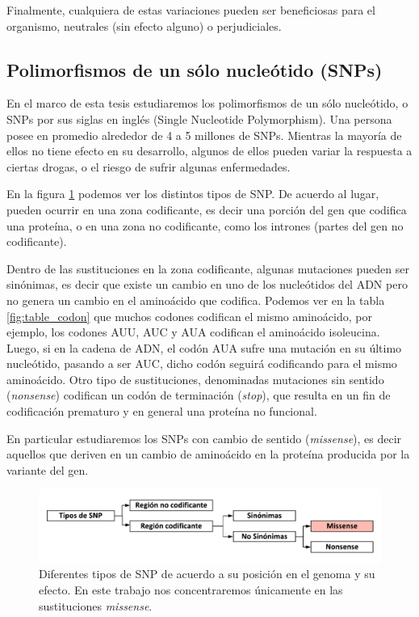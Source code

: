 Finalmente, cualquiera de estas variaciones pueden ser beneficiosas para el organismo, neutrales (sin efecto alguno) o perjudiciales. 

\subsection{Polimorfismos de un sólo nucleótido (SNPs)}

En el marco de esta tesis estudiaremos los polimorfismos de un sólo nucleótido, o SNPs por sus siglas en inglés (Single Nucleotide Polymorphism). Una persona posee en promedio alrededor de 4 a 5 millones de SNPs. Mientras la mayoría de ellos no tiene efecto en su desarrollo, algunos de ellos pueden variar la respuesta a ciertas drogas, o el riesgo de sufrir algunas enfermedades.

En la figura \ref{fig:snp_types} podemos ver los distintos tipos de SNP. De acuerdo al lugar, pueden ocurrir en una zona codificante, es decir una porción del gen que codifica una proteína, o en una zona no codificante, como los intrones (partes del gen no codificante).

Dentro de las sustituciones en la zona codificante, algunas mutaciones pueden ser sinónimas, es decir que existe un cambio en uno de los nucleótidos del ADN pero no genera un cambio en el aminoácido que codifica. Podemos ver en la tabla \ref{fig:table_codon} que muchos codones codifican el mismo aminoácido, por ejemplo, los codones AUU, AUC y AUA codifican el aminoácido isoleucina. Luego, si en la cadena de ADN, el codón AUA sufre una mutación en su último nucleótido, pasando a ser AUC, dicho codón seguirá codificando para el mismo aminoácido. Otro tipo de sustituciones, denominadas mutaciones sin sentido (\textit{nonsense}) codifican un codón de terminación (\textit{stop}), que resulta en un fin de codificación prematuro y en general una proteína no funcional.

En particular estudiaremos los SNPs con cambio de sentido (\textit{missense}), es decir aquellos que deriven en un cambio de aminoácido en la proteína producida por la variante del gen. 

\begin{figure}[H]
\centering
    \includegraphics[scale=0.7]{documents/latex/figures/1/snp_types.pdf}
    \caption{Diferentes tipos de SNP de acuerdo a su posición en el genoma y su efecto. En este trabajo nos concentraremos únicamente en las sustituciones \textit{missense}. }
    \label{fig:snp_types}
\end{figure}

